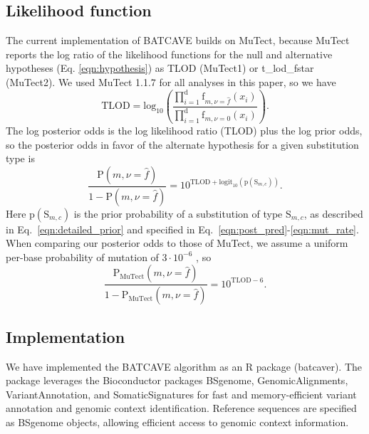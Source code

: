 \documentclass[a4,center,fleqn]{NAR}
\newcommand{\batcave}{BATCAVE\xspace}
\begin{document}
\subsection{Likelihood function}
The current implementation of \batcave builds on MuTect, because MuTect reports the log ratio of the likelihood functions for the null and alternative hypotheses (Eq. \ref{eqn:hypothesis}) as \textrm{TLOD} (MuTect1) or \textrm{t\_lod\_fstar} (MuTect2).
We used MuTect 1.1.7 for all analyses in this paper, so we have
\begin{equation}
  \label{eqn:tlod}
    \mathrm{TLOD} = \mathrm{log}_{10}\left(\frac{\prod_{i=1}^{\mathrm{d}} \textrm{f}_{m,\nu = \hat{f}}(x_i)}{\prod_{i=1}^{\mathrm{d}} \textrm{f}_{m,\nu = 0}(x_i)}\right).
\end{equation}
The log posterior odds is the log likelihood ratio (\textrm{TLOD}) plus the log prior odds, so the posterior odds in favor of the alternate hypothesis for a given substitution type is
\begin{equation}
  \label{eqn:computed_posterior}
  \frac{\mathrm{P}(m,\nu = \hat{f})}{1 - \mathrm{P}(m,\nu = \hat{f})} = 10^{\mathrm{TLOD} + \mathrm{logit}_{10}(\mathrm{p}(\mathrm{S}_{m,c}))}.
\end{equation}
Here $\mathrm{p}(\mathrm{S}_{m,c})$ is the prior probability of a substitution of type $\mathrm{S}_{m,c}$, as described in Eq.~\ref{eqn:detailed_prior} and specified in Eq.~\ref{eqn:post_pred}-\ref{eqn:mut_rate}.
When comparing our posterior odds to those of MuTect, we assume a uniform per-base probability of mutation of $3\cdot10^{-6}$ \cite{Cibulskis2013}, so
\begin{equation}  \label{eqn:mutect_posterior}
  \frac{\mathrm{P}_\mathrm{MuTect}(m,\nu = \hat{f})}{1 - \mathrm{P}_\mathrm{MuTect}(m,\nu = \hat{f})} = 10^{\mathrm{TLOD} - 6}.
\end{equation}

\subsection{Implementation}
We have implemented the \batcave algorithm as an R package (batcaver).
The package leverages the Bioconductor packages \textrm{BSgenome}, \textrm{GenomicAlignments}, \textrm{VariantAnnotation}, and \textrm{SomaticSignatures} for fast and memory-efficient variant annotation and genomic context identification. 
Reference sequences are specified as BSgenome objects, allowing efficient access to genomic context information.
\end{document}
